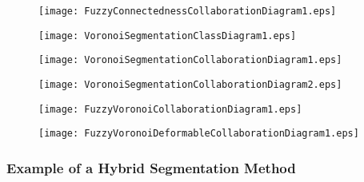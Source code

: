 \begin{figure}
\centering
\texttt{[image: FuzzyConnectednessCollaborationDiagram1.eps]}
\label{fig:UMLCollaborationDiagramoftheFuzzyConnectednessFilter}
\end{figure}

\begin{figure}
\centering
\texttt{[image: VoronoiSegmentationClassDiagram1.eps]}
\label{fig:UMLVoronoiSegmentationClassFilter}
\end{figure}

\begin{figure}
\centering
\texttt{[image: VoronoiSegmentationCollaborationDiagram1.eps]}
\label{fig:UMLClassesforImplementationofVoronoiDiagramFilter}
\end{figure}


\begin{figure}
\centering
\texttt{[image: VoronoiSegmentationCollaborationDiagram2.eps]}
\label{fig:UMLCollaborationDiagramoftheVoronoiSegmentationFilter}
\end{figure}


\begin{figure}
\centering
\texttt{[image: FuzzyVoronoiCollaborationDiagram1.eps]}
\label{fig:UMLHybridMethodDiagram1}
\end{figure}

\begin{figure}
\centering
\texttt{[image: FuzzyVoronoiDeformableCollaborationDiagram1.eps]}
\label{fig:UMLHybridMethodDiagram2}
\end{figure}


\subsubsection{Example of a Hybrid Segmentation Method}
\label{sec:HybridMethod1:Example}



